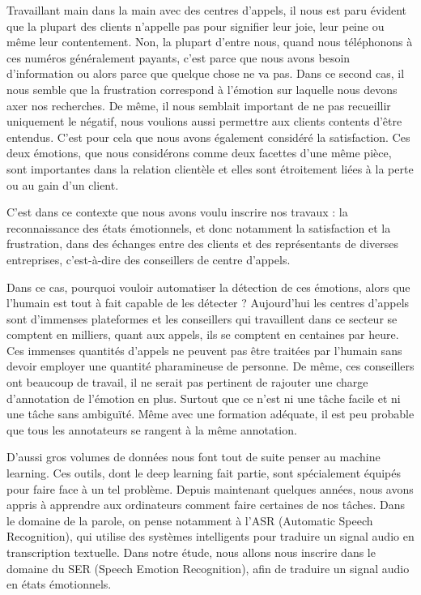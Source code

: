 Travaillant main dans la main avec des centres d'appels, il nous est paru évident que la plupart des clients n'appelle pas pour signifier leur joie, leur peine ou même leur contentement. Non, la plupart d'entre nous, quand nous téléphonons à ces numéros généralement payants, c'est parce que nous avons besoin d'information ou alors parce que quelque chose ne va pas. Dans ce second cas, il nous semble que la frustration correspond à l'émotion sur laquelle nous devons axer nos recherches. De même, il nous semblait important de ne pas recueillir uniquement le négatif, nous voulions aussi permettre aux clients contents d'être entendus. C'est pour cela que nous avons également considéré la satisfaction. Ces deux émotions, que nous considérons comme deux facettes d'une même pièce, sont importantes dans la relation clientèle et elles sont étroitement liées à la perte ou au gain d'un client.

C'est dans ce contexte que nous avons voulu inscrire nos travaux : la reconnaissance des états émotionnels, et donc notamment la satisfaction et la frustration, dans des échanges entre des clients et des représentants de diverses entreprises, c'est-à-dire des conseillers de centre d'appels.

Dans ce cas, pourquoi vouloir automatiser la détection de ces émotions, alors que l'humain est tout à fait capable de les détecter ? Aujourd'hui les centres d'appels sont d'immenses plateformes et les conseillers qui travaillent dans ce secteur se comptent en milliers, quant aux appels, ils se comptent en centaines par heure. Ces immenses quantités d'appels ne peuvent pas être traitées par l'humain sans devoir employer une quantité pharamineuse de personne. De même, ces conseillers ont beaucoup de travail, il ne serait pas pertinent de rajouter une charge d'annotation de l'émotion en plus. Surtout que ce n'est ni une tâche facile et ni une tâche sans ambiguïté. Même avec une formation adéquate, il est peu probable que tous les annotateurs se rangent à la même annotation.

D'aussi gros volumes de données nous font tout de suite penser au machine learning. Ces outils, dont le deep learning fait partie, sont spécialement équipés pour faire face à un tel problème. Depuis maintenant quelques années, nous avons appris à apprendre aux ordinateurs comment faire certaines de nos tâches. Dans le domaine de la parole, on pense notamment à l'ASR (Automatic Speech Recognition), qui utilise des systèmes intelligents pour traduire un signal audio en transcription textuelle. Dans notre étude, nous allons nous inscrire dans le domaine du SER (Speech Emotion Recognition), afin de traduire un signal audio en états émotionnels.

